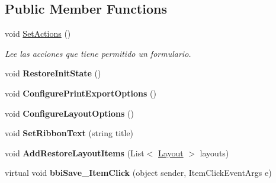 \subsection*{Public Member Functions}
\begin{DoxyCompactItemize}
\item 
void \mbox{\hyperlink{class_h_k_supply_1_1_forms_1_1_ribbon_form_base_a3e00a9c3ea88e57573dd6cfb730f0906}{Set\+Actions}} ()
\begin{DoxyCompactList}\small\item\em Lee las acciones que tiene permitido un formulario. \end{DoxyCompactList}\item 
\mbox{\label{class_h_k_supply_1_1_forms_1_1_ribbon_form_base_ab1d3918d11343c8e8e953cc1ec84fe28}} 
void {\bfseries Restore\+Init\+State} ()
\item 
\mbox{\label{class_h_k_supply_1_1_forms_1_1_ribbon_form_base_a96c09cd86882c5b71cc60345943d4b2b}} 
void {\bfseries Configure\+Print\+Export\+Options} ()
\item 
\mbox{\label{class_h_k_supply_1_1_forms_1_1_ribbon_form_base_a52752c5a289899abff7185220b7d966b}} 
void {\bfseries Configure\+Layout\+Options} ()
\item 
\mbox{\label{class_h_k_supply_1_1_forms_1_1_ribbon_form_base_ad291a5222a82a2bf33637f8dd0f5e0ac}} 
void {\bfseries Set\+Ribbon\+Text} (string title)
\item 
\mbox{\label{class_h_k_supply_1_1_forms_1_1_ribbon_form_base_a14d5ff785c8dd3e468ae9d598e2b202b}} 
void {\bfseries Add\+Restore\+Layout\+Items} (List$<$ \mbox{\hyperlink{class_h_k_supply_1_1_models_1_1_layout}{Layout}} $>$ layouts)
\item 
\mbox{\label{class_h_k_supply_1_1_forms_1_1_ribbon_form_base_a2b9ece8fa41398d9d23e6d0dcb7c1ba9}} 
virtual void {\bfseries bbi\+Save\+\_\+\+Item\+Click} (object sender, Item\+Click\+Event\+Args e)
\item 
\mbox{\label{class_h_k_supply_1_1_forms_1_1_ribbon_form_base_acf595abe27b25dc339e95176b840d318}} 

\end{DoxyCompactItemize}
